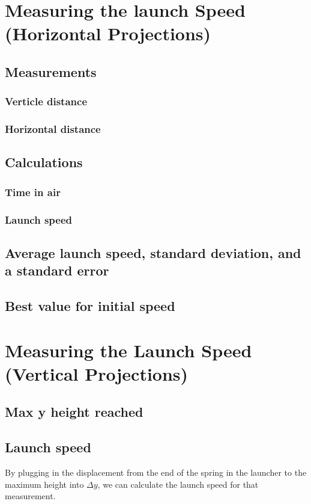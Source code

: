 \documentclass[11pt, letterpaper, includehead]{article}
\begin{document}
\tableofcontents
\pagebreak %

\pagestyle{fancy}
\fancyhead{}

\section{Measuring the launch Speed (Horizontal Projections)} %
\subsection{Measurements} %
\subsubsection{Verticle distance} %
\subsubsection{Horizontal distance} %
\subsection{Calculations} %
\subsubsection{Time in air} %
\subsubsection{Launch speed} %
\subsection{Average launch speed, standard deviation, and a standard error} %
\subsection{Best value for initial speed} %
\section {Measuring the Launch Speed (Vertical Projections)} %
\subsection{Max y height reached} %
\subsection{Launch speed} %
By plugging in the displacement from the end of the spring
in the launcher to the maximum height into $\Delta y$, we
can calculate the launch speed for that measurement.
\end{document}
